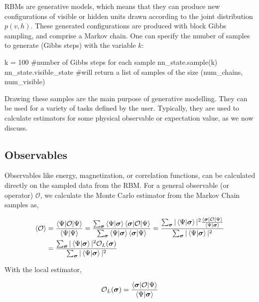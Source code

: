 \documentclass[submission, Phys]{SciPost}
\begin{document}
RBMs are generative models, which means that they can produce new configurations of visible or hidden units drawn according 
to the joint distribution $p(v,h)$.  These generated configurations are produced with block Gibbs sampling, and comprise a Markov chain.  One can specify the number of samples to generate (Gibbs steps) with the variable $k$:
\begin{python}
k = 100 #number of Gibbs steps for each sample
nn_state.sample(k)
nn_state.visible_state #will return a list of samples of the size (num_chains, num_visible)
\end{python}
Drawing these samples are the main purpose of generative modelling.  They can be used for a variety of tasks defined by the user.  Typically, they are used to calculate estimators for some physical observable or expectation value, as we now discuss.

\subsection{Observables}
\label{Sec:Observables}

Observables like energy, magnetization, or correlation functions, can be calculated directly on the sampled data from the RBM. 
For a general observable (or operator) $\mathcal{O}$, we calculate the Monte Carlo estimator from the Markov Chain samples as,

\begin{align}
\braket{\mathcal{O}} &= \frac{\braket{\Psi | \mathcal{O} | \Psi}}{\braket{\Psi | \Psi}} = \frac{\sum_{\bm{\sigma}} \braket{\Psi | {\bm{\sigma}}} \braket{{\bm{\sigma}} | \mathcal{O} | \Psi}}{\sum_{\bm{\sigma}} \braket{\Psi | {\bm{\sigma}}} \braket{{\bm{\sigma}} | \Psi}} = \frac{\sum_{\bm{\sigma}} | \braket{\Psi | {\bm{\sigma}}} |^2 \frac{\braket{{\bm{\sigma}} | \mathcal{O} | \Psi}}{\braket{\Psi | {\bm{\sigma}}}} }{\sum_{\bm{\sigma}}  | \braket{\Psi | {\bm{\sigma}}} |^2} \\
&= \frac{\sum_{\bm{\sigma}} | \braket{\Psi | {\bm{\sigma}}} |^2 \mathcal{O}_L({\bm{\sigma}}) }{\sum_{\bm{\sigma}}  | \braket{\Psi | {\bm{\sigma}}} |^2} 
\end{align}

With the local estimator,

\begin{equation}
\mathcal{O}_L({\bm{\sigma}}) =  \frac{\braket{{\bm{\sigma}} | \mathcal{O} | \Psi}}{\braket{\Psi | {\bm{\sigma}}}} 
\end{equation}
\end{document}
